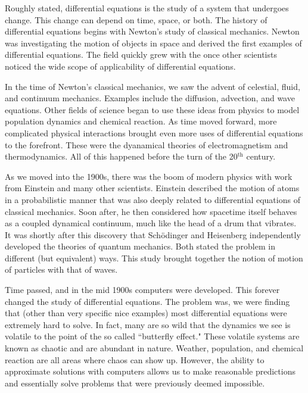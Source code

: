         Roughly stated, differential equations is the study of a system that undergoes change.  This change can depend on time, space, or both.  The history of differential equations begins with Newton's study of classical mechanics.  Newton was investigating the motion of objects in space and derived the first examples of differential equations.  The field quickly grew with the once other scientists noticed the wide scope of applicability of differential equations.  
        
        In the time of Newton's classical mechanics, we saw the advent of celestial, fluid, and continuum mechanics. Examples include the diffusion, advection, and wave equations.  Other fields of science began to use these ideas from physics to model population dynamics and chemical reaction.  As time moved forward, more complicated physical interactions brought even more uses of differential equations to the forefront.  These were the dyanamical theories of electromagnetism and thermodynamics.  All of this happened before the turn of the 20$^\textrm{th}$ century.
        
        As we moved into the 1900s, there was the boom of modern physics with work from Einstein and many other scientists.  Einstein described the motion of atoms in a probabilistic manner that was also deeply related to differential equations of classical mechanics.  Soon after, he then  considered how spacetime itself behaves as a coupled dynamical continuum, much like the head of a drum that vibrates.  It was shortly after this discovery that Sch\"odinger and Heisenberg independently developed the theories of quantum mechanics.  Both stated the problem in different (but equivalent) ways.  This study brought together the notion of motion of particles with that of waves.
        
        Time passed, and in the mid 1900s computers were developed.  This forever changed the study of differential equations.  The problem was, we were finding that (other than very specific nice examples) most differential equations were extremely hard to solve.  In fact, many are so wild that the dynamics we see is volatile to the point of the so called ``butterfly effect."  These volatile systems are known as chaotic and are abundant in nature.  Weather, population, and chemical reaction are all areas where chaos can show up.  However, the ability to approximate solutions with computers allows us to make reasonable predictions and essentially solve problems that were previously deemed impossible.
        
